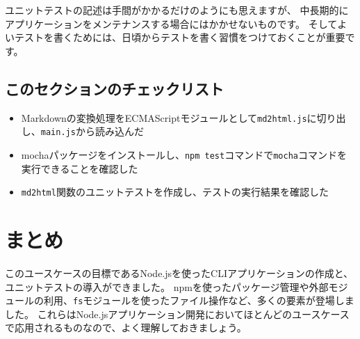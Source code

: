 ユニットテストの記述は手間がかかるだけのようにも思えますが、
中長期的にアプリケーションをメンテナンスする場合にはかかせないものです。
そしてよいテストを書くためには、日頃からテストを書く習慣をつけておくことが重要です。

\hypertarget{section-checklist}{%
\subsection{このセクションのチェックリスト}\label{section-checklist}}

\begin{itemize}
\item
  Markdownの変換処理をECMAScriptモジュールとして\texttt{md2html.js}に切り出し、\texttt{main.js}から読み込んだ
\item
  mochaパッケージをインストールし、\texttt{npm test}コマンドで\texttt{mocha}コマンドを実行できることを確認した
\item
  \texttt{md2html}関数のユニットテストを作成し、テストの実行結果を確認した
\end{itemize}

\hypertarget{unit-test-summary}{%
\section{まとめ}\label{unit-test-summary}}

このユースケースの目標であるNode.jsを使ったCLIアプリケーションの作成と、ユニットテストの導入ができました。
npmを使ったパッケージ管理や外部モジュールの利用、\texttt{fs}モジュールを使ったファイル操作など、多くの要素が登場しました。
これらはNode.jsアプリケーション開発においてほとんどのユースケースで応用されるものなので、よく理解しておきましょう。
